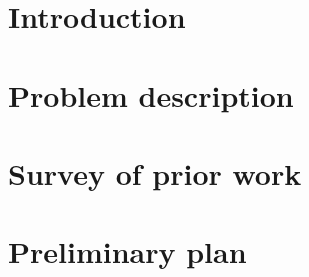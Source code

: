 \section{Introduction}

\cite{NIPS2016_6057}

\section{Problem description}
\section{Survey of prior work}
\section{Preliminary plan}

